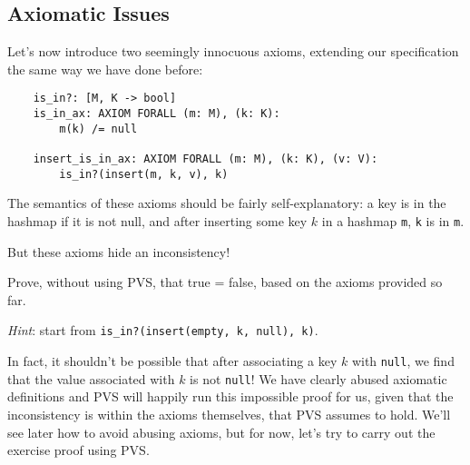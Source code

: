 \subsection{Axiomatic Issues}

Let's now introduce two seemingly innocuous axioms, extending our specification the same way we have done before:

\begin{verbatim}
	is_in?: [M, K -> bool]
	is_in_ax: AXIOM FORALL (m: M), (k: K):
	    m(k) /= null
	
	insert_is_in_ax: AXIOM FORALL (m: M), (k: K), (v: V):
	    is_in?(insert(m, k, v), k)
\end{verbatim}

The semantics of these axioms should be fairly self-explanatory: a key is in the hashmap if it is not null, and after inserting some key $k$ in a hashmap \texttt{m}, \texttt{k} is in \texttt{m}.

But these axioms hide an inconsistency!

\begin{exercise}
	Prove, without using PVS, that true = false, based on the axioms provided so far.
	
	\emph{Hint}: start from \texttt{is\_in?(insert(empty, k, null), k)}.
\end{exercise}

In fact, it shouldn't be possible that after associating a key $k$ with \texttt{null}, we find that the value associated with $k$ is not \texttt{null}!
We have clearly abused axiomatic definitions and PVS will happily run this impossible proof for us, given that the inconsistency is within the axioms themselves, that PVS assumes to hold.
We'll see later how to avoid abusing axioms, but for now, let's try to carry out the exercise proof using PVS.

